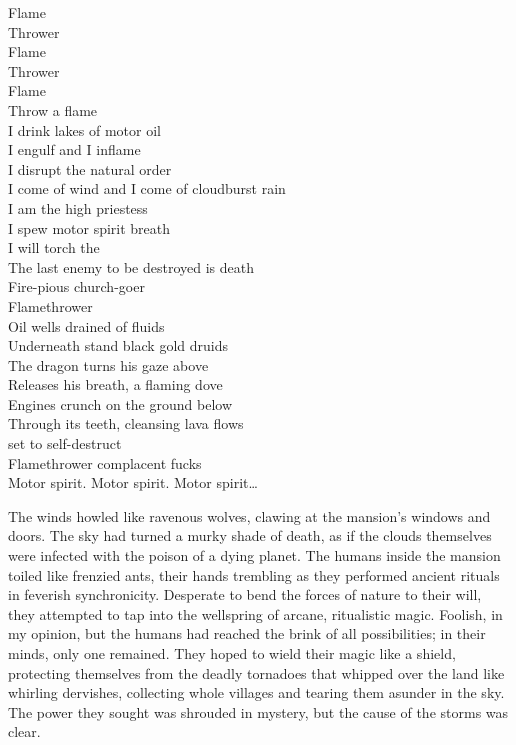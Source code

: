 Flame\\
Thrower\\
Flame\\
Thrower\\
Flame\\
Throw a flame\\

I drink lakes of motor oil\\
I engulf and I inflame\\
I disrupt the natural order\\
I come of wind and I come of cloudburst rain\\
I am the high priestess\\
I spew motor spirit breath\\
I will torch the \\
The last enemy to be destroyed is death\\
Fire-pious church-goer\\
Flamethrower\\

Oil wells drained of fluids\\
Underneath stand black gold druids\\
The dragon turns his gaze above\\
Releases his breath, a flaming dove\\
Engines crunch on the ground below\\
Through its teeth, cleansing lava flows\\
 set to self-destruct\\
Flamethrower complacent fucks\\

Motor spirit. Motor spirit. Motor spirit…\\



The winds howled like ravenous wolves, clawing at the mansion's windows and doors. The sky had turned a murky shade of death, as if the clouds themselves were infected with the poison of a dying planet. The humans inside the mansion toiled like frenzied ants, their hands trembling as they performed ancient rituals in feverish synchronicity. Desperate to bend the forces of nature to their will, they attempted to tap into the wellspring of arcane, ritualistic magic. Foolish, in my opinion, but the humans had reached the brink of all possibilities; in their minds, only one remained. They hoped to wield their magic like a shield, protecting themselves from the deadly tornadoes that whipped over the land like whirling dervishes, collecting whole villages and tearing them asunder in the sky. The power they sought was shrouded in mystery, but the cause of the storms was clear.\\

